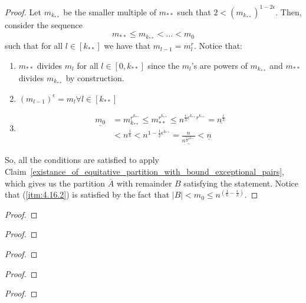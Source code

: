         \begin{proof}
            Let $m_{k_{**}}$ be the smaller multiple of $m_{**}$ such that $2 < (m_{k_{**}})^{1-2\epsilon}$.
            Then, consider the sequence
                \[
                    m_{**} \leq m_{k_{**}} < \dots < m_0
                \]
                such that for all $l \in [k_{**}]$ we have that $m_{l-1} = m_l^r$.
            Notice that:
            \begin{enumerate}
                \item $m_{**}$ divides $m_l$ for all $l \in [0, k_{**}]$ since the $m_l$'s are powers of $m_{k_{**}}$
                    and $m_{**}$ divides $m_{k_{**}}$ by construction.
                \item $(m_{l-1})^\epsilon = m_l \forall l \in [k_{**}]$
                \item \[
                    \begin{split}
                        \underline{m_0}
                            & = m_{k_{**}}^{r^{k_{**}}}
                                \leq m_{**}^{r^{k_{**}}}
                                \leq n^{\frac{\epsilon}{3}\epsilon^{k_{**}}r^{k_{**}}}
                                = \underline{n^{\frac{\epsilon}{3}}} \\
                            & < n^{\frac{1}{6}}
                                < n^{1-\frac{1}{2}\epsilon^{k_{**}}}
                                = \underline{\frac{n}{n^{\frac{1}{2}\epsilon^{k_{**}}}}}
                                < \underline{n}
                    \end{split}
                \]
            \end{enumerate}
            So, all the conditions are satisfied to apply Claim~\ref{existance_of_equitative_partition_with_bound_exceptional_pairs},
                which gives us the partition $\overline{A}$ with remainder $B$ satisfying the statement.
            Notice that (\ref{itm:4.16.2}) is satisfied by the fact that $|B| < m_0 \leq n^{\left(\frac{1}{6} - \frac{\epsilon}{3}\right)}$.
        \end{proof}

    \remark

        \begin{proof}

        \end{proof}

    \lemma[Lemma 4.19]
        \begin{proof}

        \end{proof}

    \lemma[Claim 4.21]
        \begin{proof}

        \end{proof}

    \lemma[Remark 4.22]
        \begin{proof}

        \end{proof}

    \theorem[Theorem 4.23]
        \begin{proof}

        \end{proof}



